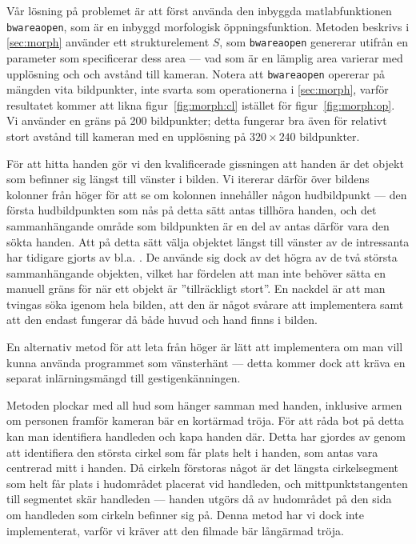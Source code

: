 Vår lösning på problemet är att först använda den inbyggda
matlabfunktionen \texttt{bwareaopen}, som är en inbyggd morfologisk
öppningsfunktion. Metoden beskrivs i
\ref{sec:morph} använder ett strukturelement $S$, som \texttt{bwareaopen}
genererar utifrån en parameter som specificerar
dess area --- vad som är en lämplig area
varierar med upplösning och
och avstånd till kameran. Notera att \texttt{bwareaopen} opererar på mängden
vita bildpunkter, inte svarta som operationerna i \ref{sec:morph}, varför
resultatet kommer att likna figur~\ref{fig:morph:cl} istället för
figur~\ref{fig:morph:op}.  Vi använder en gräns på 200
bildpunkter; detta fungerar bra även för relativt stort avstånd till
kameran med en upplösning på $320\times240$ bildpunkter.

För att hitta handen gör vi den kvalificerade gissningen att handen är det
objekt som befinner sig längst till vänster i bilden.
Vi itererar därför över bildens kolonner från
höger för att se om kolonnen innehåller någon hudbildpunkt --- den första
hudbildpunkten som nås på detta sätt antas tillhöra handen, och det
sammanhängande område som bildpunkten är en del av antas därför vara den sökta
handen. Att på detta sätt välja objektet längst till vänster av de
intressanta har tidigare gjorts av bl.a. . De använde
sig dock av det högra av de två största sammanhängande objekten,
vilket har fördelen att man inte behöver sätta en manuell gräns för
när ett objekt är ''tillräckligt stort''. En nackdel är att man tvingas
söka igenom hela bilden, att den är något svårare att
implementera samt att den endast fungerar då både huvud och hand finns
i bilden.

En alternativ metod för att leta från
höger är lätt att implementera om man vill kunna använda programmet
som vänsterhänt --- detta kommer dock att kräva en
separat inlärningsmängd till gestigenkänningen. 

Metoden plockar med all hud som hänger samman med
handen, inklusive armen om personen framför kameran bär en kortärmad tröja. 
För att
råda bot på detta kan man identifiera handleden och kapa handen
där. Detta har gjordes av  genom att identifiera den 
största cirkel
som får plats helt i handen, som antas vara centrerad mitt i handen. Då
cirkeln förstoras något är det längsta cirkelsegment som helt får
plats i hudområdet placerat vid handleden, och mittpunktstangenten
till segmentet skär handleden --- handen utgörs då av hudområdet på den
sida om handleden som cirkeln befinner sig på. Denna metod har vi dock
inte implementerat, varför vi kräver att den filmade bär
långärmad tröja. 
